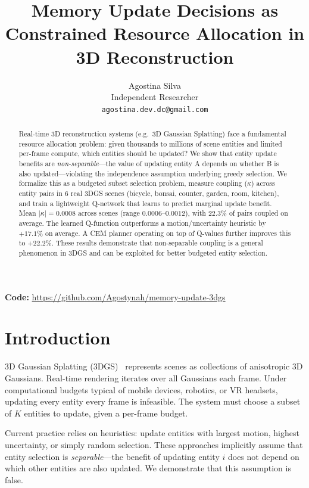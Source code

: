 \documentclass[10pt,twocolumn]{article}
\title{Memory Update Decisions as Constrained Resource Allocation in 3D Reconstruction}
\author{Agostina Silva\\
Independent Researcher\\
{\tt\small agostina.dev.dc@gmail.com}
}
\date{}
\begin{document}
\maketitle

\begin{abstract}
Real-time 3D reconstruction systems (e.g.\ 3D Gaussian Splatting) face a fundamental resource allocation problem: given thousands to millions of scene entities and limited per-frame compute, which entities should be updated? We show that entity update benefits are \textit{non-separable}---the value of updating entity A depends on whether B is also updated---violating the independence assumption underlying greedy selection. We formalize this as a budgeted subset selection problem, measure coupling ($\kappa$) across entity pairs in 6 real 3DGS scenes (bicycle, bonsai, counter, garden, room, kitchen), and train a lightweight Q-network that learns to predict marginal update benefit. Mean $|\kappa| = 0.0008$ across scenes (range $0.0006$--$0.0012$), with $22.3\%$ of pairs coupled on average. The learned Q-function outperforms a motion/uncertainty heuristic by $+17.1\%$ on average. A CEM planner operating on top of Q-values further improves this to $+22.2\%$. These results demonstrate that non-separable coupling is a general phenomenon in 3DGS and can be exploited for better budgeted entity selection.
\end{abstract}

\noindent\textbf{Code:} \url{https://github.com/Agostynah/memory-update-3dgs}

\section{Introduction}
\label{sec:intro}

3D Gaussian Splatting (3DGS)~\cite{kerbl3dgs} represents scenes as collections of anisotropic 3D Gaussians. Real-time rendering iterates over all Gaussians each frame. Under computational budgets typical of mobile devices, robotics, or VR headsets, updating every entity every frame is infeasible. The system must choose a subset of $K$ entities to update, given a per-frame budget.

Current practice relies on heuristics: update entities with largest motion, highest uncertainty, or simply random selection. These approaches implicitly assume that entity selection is \textit{separable}---the benefit of updating entity $i$ does not depend on which other entities are also updated. We demonstrate that this assumption is false.
\end{document}
